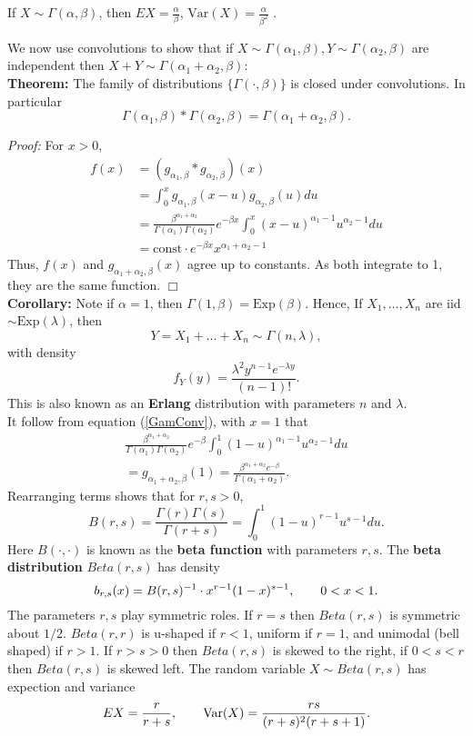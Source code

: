 \documentclass[12pt,oneside]{article}
\begin{document}
\noindent If $X \sim \Gamma(\alpha, \beta)$, then $EX = \frac{\alpha}{\beta}$, $\mbox{Var}(X) = \frac{\alpha}{\beta^2}$ .

We now use convolutions to show that if $X \sim \Gamma(\alpha_1,\beta), Y\sim \Gamma(\alpha_2,\beta)$ are independent then $X+Y \sim \Gamma(\alpha_1+\alpha_2,\beta)$: \\

\noindent \textbf{Theorem:} The family of distributions $\{\Gamma(\cdot,\beta)\}$ is closed under convolutions.  In particular
\[ \Gamma (\alpha_1,\beta) \ast \Gamma(\alpha_2, \beta) = \Gamma(\alpha_1+\alpha_2,\beta).\]

\noindent \emph{Proof:} For $x>0$,
\begin{align}f(x) &= (g_{\alpha_1,\beta} \ast g_{\alpha_2,\beta}) (x) \nonumber \\
&= \int_0^x g_{\alpha_1,\beta}(x-u) g_{\alpha_2,\beta} (u) du \nonumber \\
&= \frac{\beta^{\alpha_1+\alpha_2}}{\Gamma (\alpha_1) \Gamma (\alpha_2)} e^{-\beta x} \int_0^x (x-u)^{\alpha_1-1} u^{\alpha_2-1} du \label{GamConv}\\
&= \mbox{const} \cdot e^{-\beta x} x^{\alpha_1+\alpha_2 -1} \nonumber
\end{align}
Thus, $f(x)$ and $g_{\alpha_1+\alpha_2, \beta}(x)$ agree up to constants.  As both integrate to 1, they are the same function. $\Box$\\

\noindent \textbf{Corollary:}  Note if $\alpha = 1$, then $\Gamma (1,\beta) = \mbox{Exp} (\beta)$.  Hence, If $X_1,\hdots,X_n$ are iid $\sim \mbox{Exp}(\lambda)$, then \[Y=X_1+\hdots+X_n \sim \Gamma(n,\lambda),\] with density
\[f_Y(y) = \frac{\lambda^2 y^{n-1} e^{-\lambda y}}{(n-1)!} .\]
This is also known as an \textbf{Erlang} distribution with parameters $n$ and $\lambda$.\\

It follow from equation (\ref{GamConv}), with $x=1$ that
\begin{eqnarray*}
\frac{\beta^{\alpha_1+\alpha_2}}{\Gamma (\alpha_1) \Gamma (\alpha_2)} e^{-\beta} \int_0^1 (1-u)^{\alpha_1-1} u^{\alpha_2-1} du \\
= g_{\alpha_1+\alpha_2,\beta}(1) = \frac{\beta^{\alpha_1+\alpha_2}e^{-\beta}}{\Gamma (\alpha_1+\alpha_2)} .\end{eqnarray*}
Rearranging terms shows that for $r,s>0$,
\[B(r,s)=\frac{\Gamma (r) \Gamma(s)}{\Gamma(r+s)} = \int_0^1 (1-u)^{r-1} u^{s-1} du. \]
Here $B(\cdot,\cdot)$ is known as the \textbf{beta function} with parameters $r,s$.  The \textbf{beta distribution} $Beta(r,s)$ has density
\[b_{r,s}(x) = B(r,s)^{-1} \cdot x^{r-1}(1-x)^{s-1}, \hspace{20 pt} 0<x<1.\]
The parameters $r,s$ play symmetric roles.  If $r=s$ then $Beta (r,s)$ is symmetric about $1/2$.  $Beta(r,r)$ is u-shaped if $r < 1$, uniform if $r=1$, and unimodal (bell shaped) if $r>1$.  If $r>s>0$ then $Beta(r,s)$ is skewed to the right, if $0<s<r$ then $Beta(r,s)$ is skewed left.  The random variable $X \sim Beta(r,s)$ has expection and variance
\[EX = \frac{r}{r+s}, \hspace{20 pt} \mbox{Var}(X) = \frac{rs}{(r+s)^2(r+s+1)}.\] \\
\end{document}

